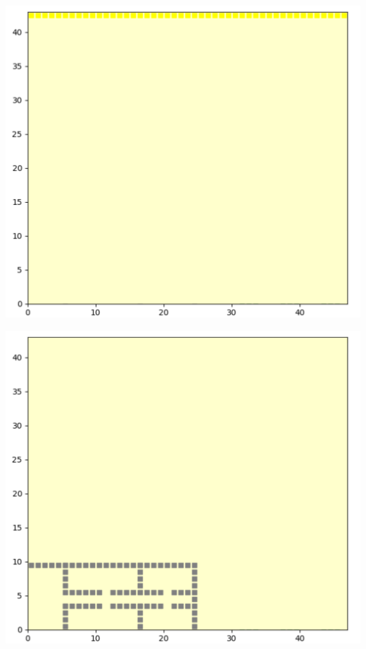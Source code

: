 \documentclass[12pt]{article}
\begin{document}
\begin{minipage}[ht]{0.45\linewidth}
\centering
\includegraphics[width=\textwidth]{Figures/Map/ChargingStation.png}
\end{minipage}
\hspace{0.5cm}
\begin{minipage}[ht]{0.45\linewidth}
\centering
\includegraphics[width=\textwidth]{Figures/Map/Offices.png}
\end{minipage}
\end{document}
